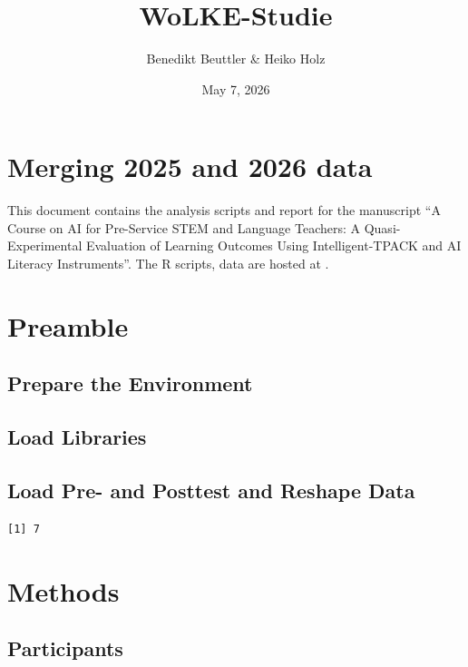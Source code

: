 \documentclass[
  letterpaper,
  DIV=11,
  numbers=noendperiod]{scrartcl}
\title{WoLKE-Studie}
\author{Benedikt Beuttler \& Heiko Holz}
\date{May 7, 2026}
\renewcommand*\contentsname{Table of contents}
\newcommand\contentsname{Table of contents}
\begin{document}
\maketitle

\renewcommand*\contentsname{Table of contents}
{
\hypersetup{linkcolor=}
\setcounter{tocdepth}{2}
\tableofcontents
}

\section{Merging 2025 and 2026 data}\label{merging-2025-and-2026-data}

This document contains the analysis scripts and report for the
manuscript ``A Course on AI for Pre-Service STEM and Language Teachers:
A Quasi-Experimental Evaluation of Learning Outcomes Using
Intelligent-TPACK and AI Literacy Instruments''. The R scripts, data are
hosted at .

\section{Preamble}\label{preamble}

\subsection{Prepare the Environment}\label{prepare-the-environment}

\subsection{Load Libraries}\label{load-libraries}

\subsection{Load Pre- and Posttest and Reshape
Data}\label{load-pre--and-posttest-and-reshape-data}

\begin{verbatim}
[1] 7
\end{verbatim}

\section{Methods}\label{methods}

\subsection{Participants}\label{participants}
\end{document}
